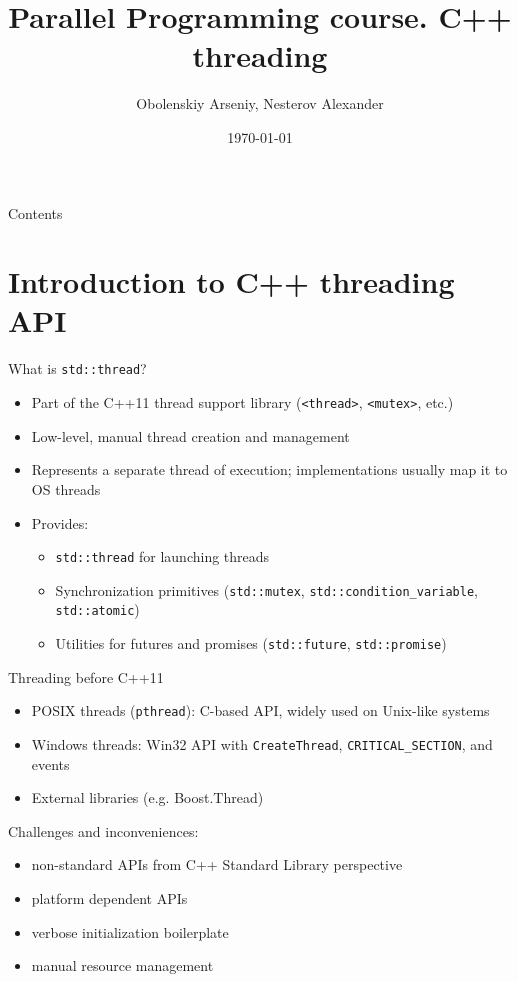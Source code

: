 \documentclass{beamer}
\title[Parallel Programming. C++ threading]{Parallel Programming course. C++ threading}
\author{Obolenskiy Arseniy, Nesterov Alexander}
\institute{Nizhny Novgorod State University}
\date{\today} %
\begin{document}
\begin{frame}
  \titlepage
\end{frame}

\begin{frame}{Contents}
  \tableofcontents
\end{frame}

\section{Introduction to C++ threading API}

\begin{frame}{What is \texttt{std::thread}?}
  \begin{itemize}
    \item Part of the C++11 thread support library (\texttt{<thread>}, \texttt{<mutex>}, etc.)
    \item Low-level, manual thread creation and management
    \item Represents a separate thread of execution; implementations usually map it to OS threads
    \item Provides:
      \begin{itemize}
        \item \texttt{std::thread} for launching threads
        \item Synchronization primitives (\texttt{std::mutex}, \texttt{std::condition\_variable}, \texttt{std::atomic})
        \item Utilities for futures and promises (\texttt{std::future}, \texttt{std::promise})
      \end{itemize}
  \end{itemize}
\end{frame}

\begin{frame}{Threading before C++11}
  \begin{itemize}
    \item POSIX threads (\texttt{pthread}): C-based API, widely used on Unix-like systems
    \item Windows threads: Win32 API with \texttt{CreateThread}, \texttt{CRITICAL\_SECTION}, and events
    \item External libraries (e.g. Boost.Thread)
  \end{itemize}
  Challenges and inconveniences:
  \begin{itemize}
    \item non-standard APIs from C++ Standard Library perspective
    \item platform dependent APIs
    \item verbose initialization boilerplate
    \item manual resource management
  \end{itemize}
\end{frame}
\end{document}
